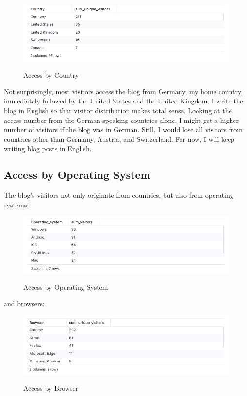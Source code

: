 \begin{figure}[H]
\centering
\caption {Access by Country}
\includegraphics[width=\linewidth]{images/access-country.png}
\label{fig:accessCountry}
\end{figure}

Not surprisingly, most visitors access the blog from Germany, my home country, immediately followed by the United States and the United Kingdom. I write the blog in English so that visitor distribution makes total sense. Looking at the access number from the German-speaking countries alone, I might get a higher number of visitors if the blog was in German. Still, I would lose all visitors from countries other than Germany, Austria, and Switzerland. For now, I will keep writing blog posts in English.

\subsection{Access by Operating System}

The blog's visitors not only originate from countries, but also from operating systems:

\begin{figure}[H]
\centering
\caption {Access by Operating System}
\includegraphics[width=\linewidth]{images/access-os.png}
\label{fig:accessOS}
\end{figure}

and browsers:

\begin{figure}[H]
\centering
\caption {Access by Browser}
\includegraphics[width=\linewidth]{images/access-browser.png}
\label{fig:accessBrowser}
\end{figure}

